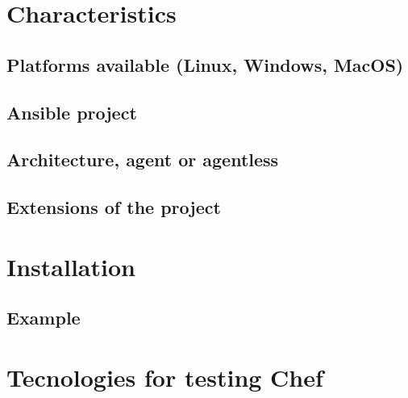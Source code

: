 \documentclass[12pt,a4paper,openright,twoside]{book}
\begin{document}
\section{Characteristics}

\subsection{Platforms available (Linux, Windows, MacOS)}

\subsection{Ansible project}

\subsection{Architecture, agent or agentless}


\subsection{Extensions of the project}

\section{Installation}

\subsection{Example}

\section{Tecnologies for testing Chef}

\end{document}
